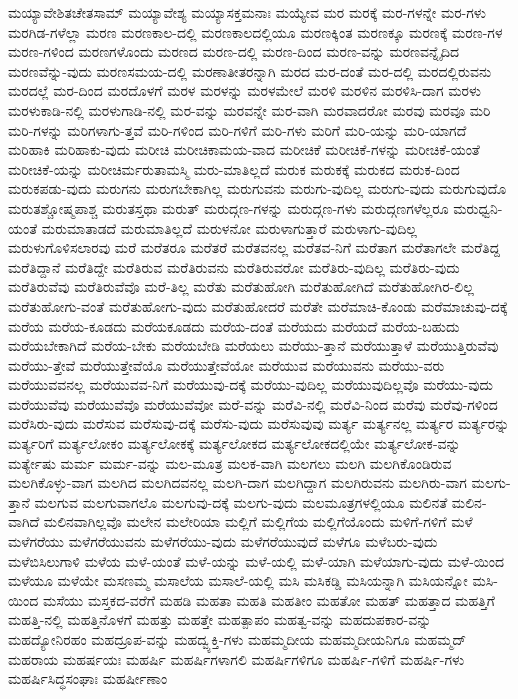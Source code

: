 {ಮಯ್ಯಾವೇಶಿತಚೇತಸಾಮ್
ಮಯ್ಯಾವೇಶ್ಯ
ಮಯ್ಯಾಸಕ್ತಮನಾಃ
ಮಯ್ಯೇವ
ಮರ
ಮರಕ್ಕೆ
ಮರ-ಗಳನ್ನೇ
ಮರ-ಗಳು
ಮರಗಿಡ-ಗಳೆಲ್ಲಾ
ಮರಣ
ಮರಣಕಾಲ-ದಲ್ಲಿ
ಮರಣಕಾಲದಲ್ಲಿಯೂ
ಮರಣಕ್ಕಿಂತ
ಮರಣಕ್ಕೂ
ಮರಣಕ್ಕೆ
ಮರಣ-ಗಳ
ಮರಣ-ಗಳಿಂದ
ಮರಣಗಳೊಂದು
ಮರಣದ
ಮರಣ-ದಲ್ಲಿ
ಮರಣ-ದಿಂದ
ಮರಣ-ವನ್ನು
ಮರಣವನ್ನೈದಿದ
ಮರಣವೆನ್ನು-ವುದು
ಮರಣಸಮಯ-ದಲ್ಲಿ
ಮರಣಾತೀತರನ್ನಾಗಿ
ಮರದ
ಮರ-ದಂತೆ
ಮರ-ದಲ್ಲಿ
ಮರದಲ್ಲಿರುವನು
ಮರದಲ್ಲೆ
ಮರ-ದಿಂದ
ಮರದೊಳಗೆ
ಮರಳ
ಮರಳನ್ನು
ಮರಳಮೇಲೆ
ಮರಳಿ
ಮರಳಿನ
ಮರಳಿಸಿ-ದಾಗ
ಮರಳು
ಮರಳುಕಾಡಿ-ನಲ್ಲಿ
ಮರಳುಗಾಡಿ-ನಲ್ಲಿ
ಮರ-ವನ್ನು
ಮರವನ್ನೇ
ಮರ-ವಾಗಿ
ಮರವಾದರೋ
ಮರವು
ಮರವೂ
ಮರಿ
ಮರಿ-ಗಳನ್ನು
ಮರಿಗಳಾಗು-ತ್ತವೆ
ಮರಿ-ಗಳಿಂದ
ಮರಿ-ಗಳಿಗೆ
ಮರಿ-ಗಳು
ಮರಿಗೆ
ಮರಿ-ಯನ್ನು
ಮರಿ-ಯಾಗದೆ
ಮರಿಹಾಕಿ
ಮರಿಹಾಕು-ವುದು
ಮರೀಚಿ
ಮರೀಚಿಕಾಮಯ-ವಾದ
ಮರೀಚಿಕೆ
ಮರೀಚಿಕೆ-ಗಳನ್ನು
ಮರೀಚಿಕೆ-ಯಂತೆ
ಮರೀಚಿಕೆ-ಯನ್ನು
ಮರೀಚಿರ್ಮರುತಾಮಸ್ಮಿ
ಮರು-ಮಾತಿಲ್ಲದೆ
ಮರುಕ
ಮರುಕಕ್ಕೆ
ಮರುಕದ
ಮರುಕ-ದಿಂದ
ಮರುಕಪಡು-ವುದು
ಮರುಗನು
ಮರುಗಬೇಕಾಗಿಲ್ಲ
ಮರುಗುವನು
ಮರುಗು-ವುದಿಲ್ಲ
ಮರುಗು-ವುದು
ಮರುಗುವುದೊ
ಮರುತಶ್ಚೋಷ್ಮಪಾಶ್ಚ
ಮರುತಸ್ತಥಾ
ಮರುತ್
ಮರುದ್ಗಣ-ಗಳನ್ನು
ಮರುದ್ಗಣ-ಗಳು
ಮರುದ್ಗಣಗಳೆಲ್ಲರೂ
ಮರುಧ್ವನಿ-ಯಂತೆ
ಮರುಮಾತಾಡದೆ
ಮರುಮಾತಿಲ್ಲದೆ
ಮರುಳನೋ
ಮರುಳಾಗುತ್ತಾರೆ
ಮರುಳಾಗು-ವುದಿಲ್ಲ
ಮರುಳುಗೊಳಿಸಲಾರವು
ಮರೆ
ಮರೆತರೂ
ಮರೆತರೆ
ಮರೆತವನಲ್ಲ
ಮರೆತವ-ನಿಗೆ
ಮರೆತಾಗ
ಮರೆತಾಗಲೇ
ಮರೆತಿದ್ದ
ಮರೆತಿದ್ದಾನೆ
ಮರೆತಿದ್ದೇ
ಮರೆತಿರುವ
ಮರೆತಿರುವನು
ಮರೆತಿರುವರೋ
ಮರೆತಿರು-ವುದಿಲ್ಲ
ಮರೆತಿರು-ವುದು
ಮರೆತಿರುವೆವು
ಮರೆತಿರುವೆವೊ
ಮರೆ-ತಿಲ್ಲ
ಮರೆತು
ಮರೆತುಹೋಗಿ
ಮರೆತುಹೋಗಿದೆ
ಮರೆತುಹೋಗಿರ-ಲಿಲ್ಲ
ಮರೆತುಹೋಗು-ವಂತೆ
ಮರೆತುಹೋಗು-ವುದು
ಮರೆತುಹೋದರೆ
ಮರೆತೇ
ಮರೆಮಾಚಿ-ಕೊಂಡು
ಮರೆಮಾಚುವು-ದಕ್ಕೆ
ಮರೆಯ
ಮರೆಯ-ಕೂಡದು
ಮರೆಯಕೂಡದು
ಮರೆಯ-ದಂತೆ
ಮರೆಯದು
ಮರೆಯದೆ
ಮರೆಯ-ಬಹುದು
ಮರೆಯಬೇಕಾಗಿದೆ
ಮರೆಯ-ಬೇಕು
ಮರೆಯಬೇಡಿ
ಮರೆಯಲು
ಮರೆಯು-ತ್ತಾನೆ
ಮರೆಯುತ್ತಾಳೆ
ಮರೆಯುತ್ತಿರುವೆವು
ಮರೆಯು-ತ್ತೇವೆ
ಮರೆಯುತ್ತೇವೆಯೊ
ಮರೆಯುತ್ತೇವೆಯೋ
ಮರೆಯುವ
ಮರೆಯುವನು
ಮರೆಯು-ವರು
ಮರೆಯುವವನಲ್ಲ
ಮರೆಯುವವ-ನಿಗೆ
ಮರೆಯುವು-ದಕ್ಕೆ
ಮರೆಯು-ವುದಿಲ್ಲ
ಮರೆಯುವುದಿಲ್ಲವೊ
ಮರೆಯು-ವುದು
ಮರೆಯುವೆವು
ಮರೆಯುವೆವೊ
ಮರೆಯುವೆವೋ
ಮರೆ-ವನ್ನು
ಮರೆವಿ-ನಲ್ಲಿ
ಮರೆವಿ-ನಿಂದ
ಮರೆವು
ಮರೆವು-ಗಳಿಂದ
ಮರೆಸಿರು-ವುದು
ಮರೆಸುವ
ಮರೆಸುವು-ದಕ್ಕೆ
ಮರೆಸು-ವುದು
ಮರೆಸುವುವು
ಮರ್ತ್ಯ
ಮರ್ತ್ಯನಲ್ಲ
ಮರ್ತ್ಯರ
ಮರ್ತ್ಯರನ್ನು
ಮರ್ತ್ಯರಿಗೆ
ಮರ್ತ್ಯಲೋಕಂ
ಮರ್ತ್ಯಲೋಕಕ್ಕೆ
ಮರ್ತ್ಯಲೋಕದ
ಮರ್ತ್ಯಲೋಕದಲ್ಲಿಯೇ
ಮರ್ತ್ಯಲೋಕ-ವನ್ನು
ಮರ್ತ್ಯೇಷು
ಮರ್ಮ
ಮರ್ಮ-ವನ್ನು
ಮಲ-ಮೂತ್ರ
ಮಲಕ-ವಾಗಿ
ಮಲಗಲು
ಮಲಗಿ
ಮಲಗಿಕೊಂಡಿರುವ
ಮಲಗಿಕೊಳ್ಳು-ವಾಗ
ಮಲಗಿದ
ಮಲಗಿದವನಲ್ಲ
ಮಲಗಿ-ದಾಗ
ಮಲಗಿದ್ದಾಗ
ಮಲಗಿರುವನು
ಮಲಗಿರು-ವಾಗ
ಮಲಗು-ತ್ತಾನೆ
ಮಲಗುವ
ಮಲಗುವಾಗಲೊ
ಮಲಗುವು-ದಕ್ಕೆ
ಮಲಗು-ವುದು
ಮಲಮೂತ್ರಗಳಲ್ಲಿಯೂ
ಮಲಿನತೆ
ಮಲಿನ-ವಾಗಿದೆ
ಮಲಿನವಾಗಿಲ್ಲವೊ
ಮಲೇನ
ಮಲೇರಿಯಾ
ಮಲ್ಲಿಗೆ
ಮಲ್ಲಿಗೆಯ
ಮಲ್ಲಿಗೆಯೊಂದು
ಮಳಿಗೆ-ಗಳಿಗೆ
ಮಳೆ
ಮಳೆಗರೆಯು
ಮಳೆಗರೆಯುವನು
ಮಳೆಗರೆಯು-ವುದು
ಮಳೆಗರೆಯುವುದೆ
ಮಳೆಗೂ
ಮಳೆಬರು-ವುದು
ಮಳೆಬಿಸಿಲುಗಾಳಿ
ಮಳೆಯ
ಮಳೆ-ಯಂತೆ
ಮಳೆ-ಯನ್ನು
ಮಳೆ-ಯಲ್ಲಿ
ಮಳೆ-ಯಾಗಿ
ಮಳೆಯಾಗು-ವುದು
ಮಳೆ-ಯಿಂದ
ಮಳೆಯೂ
ಮಳೆಯೇ
ಮಸಣಮ್ಮ
ಮಸಾಲೆಯ
ಮಸಾಲೆ-ಯಲ್ಲಿ
ಮಸಿ
ಮಸಿಕಡ್ಡಿ
ಮಸಿಯನ್ನಾಗಿ
ಮಸಿಯನ್ನೋ
ಮಸಿ-ಯಿಂದ
ಮಸೆಯು
ಮಸ್ತಕದ-ವರೆಗೆ
ಮಹಡಿ
ಮಹತಾ
ಮಹತಿ
ಮಹತೀಂ
ಮಹತೋ
ಮಹತ್
ಮಹತ್ತಾದ
ಮಹತ್ತಿಗೆ
ಮಹತ್ತಿ-ನಲ್ಲಿ
ಮಹತ್ತಿನೊಳಗೆ
ಮಹತ್ತು
ಮಹತ್ತೇ
ಮಹತ್ಪಾಪಂ
ಮಹತ್ವ-ವನ್ನು
ಮಹದುಪಕಾರ-ವನ್ನು
ಮಹದ್ಯೋನಿರಹಂ
ಮಹದ್ರೂಪ-ವನ್ನು
ಮಹದ್ವ್ಯಕ್ತಿ-ಗಳು
ಮಹಮ್ಮದೀಯ
ಮಹಮ್ಮದೀಯನಿಗೂ
ಮಹಮ್ಮದ್
ಮಹರಾಯ
ಮಹರ್ಷಯಃ
ಮಹರ್ಷಿ
ಮಹರ್ಷಿಗಳಾಗಲಿ
ಮಹರ್ಷಿಗಳಿಗೂ
ಮಹರ್ಷಿ-ಗಳಿಗೆ
ಮಹರ್ಷಿ-ಗಳು
ಮಹರ್ಷಿಸಿದ್ಧಸಂಘಾಃ
ಮಹರ್ಷೀಣಾಂ
}

